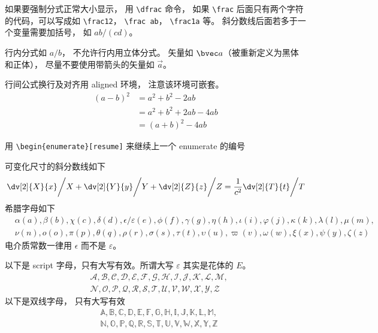 如果要强制分式正常大小显示， 用 \lstinline|\dfrac| 命令， 如果 \lstinline|\frac| 后面只有两个字符的代码，可以写成如 \lstinline|\frac12|， \lstinline|\frac ab|， \lstinline|\frac1a| 等。 斜分数线后面若多于一个变量需要加括号， 如 $ab/(cd)$。

行内分式如 $a/b$， 不允许行内用立体分式。 矢量如 $\bvec a$（被重新定义为黑体和正体）， 尽量不要使用带箭头的矢量如 $\vec a$。 

行间公式换行及对齐用 aligned 环境， 注意该环境可嵌套。
\begin{equation}
\begin{aligned}
(a-b)^2 &= a^2+b^2 - 2ab \\
& = a^2+b^2+2ab-4ab\\
& = (a+b)^2-4ab
\end{aligned}
\end{equation}

用 \lstinline|\begin{enumerate}[resume]|  来继续上一个 enumerate 的编号

可变化尺寸的斜分数线如下
\begin{equation}
\left. \dv[2]{X}{x} \middle/ X + \dv[2]{Y}{y} \middle/ Y + \dv[2]{Z}{z} \middle/ Z  = \frac{1}{c^2}  \dv[2]{T}{t} \middle/ T\right.
\end{equation}
希腊字母如下
\begin{equation}
\begin{aligned}
&\alpha (a), \beta (b), \chi (c), \delta (d), \epsilon/\varepsilon (e), \phi (f), \gamma (g),
\eta (h), \iota (i), \varphi (j), \kappa (k), \lambda (l), \mu (m),\\
& \nu (n), o (o), \pi (p), \theta (q), \rho (r), \sigma (s), \tau (t), \upsilon (u), \varpi (v), \omega (w), \xi (x), \psi (y), \zeta (z)
\end{aligned}
\end{equation}
电介质常数一律用 $\epsilon$ 而不是 $\varepsilon$。

以下是 script 字母，只有大写有效。所谓大写 $\varepsilon$ 其实是花体的 $E$。 
\begin{equation}
\begin{aligned}
&\mathcal{A, B, C, D, E, F, G, H, I, J, K, L, M,}\\
&\mathcal{N, O, P, Q, R, S, T, U, V, W, X, Y, Z}
\end{aligned}
\end{equation}
以下是双线字母， 只有大写有效
\begin{equation}
\begin{aligned}
&\mathbb{A, B, C, D, E, F, G, H, I, J, K, L, M,}\\
&\mathbb{N, O, P, Q, R, S, T, U, V, W, X, Y, Z}
\end{aligned}
\end{equation}


